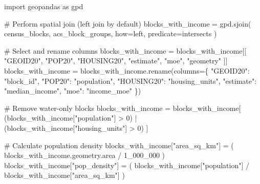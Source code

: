 \documentclass[
  letterpaper,
  DIV=11,
  numbers=noendperiod]{scrartcl}
\newenvironment{Shaded}{\begin{snugshade}}{\end{snugshade}}
\newcommand{\CommentTok}[1]{\textcolor[rgb]{0.37,0.37,0.37}{#1}}
\newcommand{\DecValTok}[1]{\textcolor[rgb]{0.68,0.00,0.00}{#1}}
\newcommand{\ImportTok}[1]{\textcolor[rgb]{0.00,0.46,0.62}{#1}}
\newcommand{\NormalTok}[1]{\textcolor[rgb]{0.00,0.23,0.31}{#1}}
\newcommand{\OperatorTok}[1]{\textcolor[rgb]{0.37,0.37,0.37}{#1}}
\newcommand{\StringTok}[1]{\textcolor[rgb]{0.13,0.47,0.30}{#1}}
\begin{document}
\begin{Shaded}
\begin{Highlighting}[]
\ImportTok{import}\NormalTok{ geopandas }\ImportTok{as}\NormalTok{ gpd}

\CommentTok{\# Perform spatial join (left join by default)}
\NormalTok{blocks\_with\_income }\OperatorTok{=}\NormalTok{ gpd.sjoin(}
\NormalTok{    census\_blocks,}
\NormalTok{    acs\_block\_groups,}
\NormalTok{    how}\OperatorTok{=}\StringTok{\textquotesingle{}left\textquotesingle{}}\NormalTok{,}
\NormalTok{    predicate}\OperatorTok{=}\StringTok{\textquotesingle{}intersects\textquotesingle{}}
\NormalTok{)}

\CommentTok{\# Select and rename columns}
\NormalTok{blocks\_with\_income }\OperatorTok{=}\NormalTok{ blocks\_with\_income[[}
    \StringTok{"GEOID20"}\NormalTok{, }\StringTok{"POP20"}\NormalTok{, }\StringTok{"HOUSING20"}\NormalTok{, }\StringTok{"estimate"}\NormalTok{, }\StringTok{"moe"}\NormalTok{, }\StringTok{"geometry"}
\NormalTok{]]}
\NormalTok{blocks\_with\_income }\OperatorTok{=}\NormalTok{ blocks\_with\_income.rename(columns}\OperatorTok{=}\NormalTok{\{}
    \StringTok{"GEOID20"}\NormalTok{: }\StringTok{"block\_id"}\NormalTok{,}
    \StringTok{"POP20"}\NormalTok{: }\StringTok{"population"}\NormalTok{,}
    \StringTok{"HOUSING20"}\NormalTok{: }\StringTok{"housing\_units"}\NormalTok{,}
    \StringTok{"estimate"}\NormalTok{: }\StringTok{"median\_income"}\NormalTok{,}
    \StringTok{"moe"}\NormalTok{: }\StringTok{"income\_moe"}
\NormalTok{\})}

\CommentTok{\# Remove water{-}only blocks}
\NormalTok{blocks\_with\_income }\OperatorTok{=}\NormalTok{ blocks\_with\_income[}
\NormalTok{    (blocks\_with\_income[}\StringTok{"population"}\NormalTok{] }\OperatorTok{\textgreater{}} \DecValTok{0}\NormalTok{)}
    \OperatorTok{|}\NormalTok{ (blocks\_with\_income[}\StringTok{"housing\_units"}\NormalTok{] }\OperatorTok{\textgreater{}} \DecValTok{0}\NormalTok{)}
\NormalTok{]}

\CommentTok{\# Calculate population density}
\NormalTok{blocks\_with\_income[}\StringTok{"area\_sq\_km"}\NormalTok{] }\OperatorTok{=}\NormalTok{ (}
\NormalTok{    blocks\_with\_income.geometry.area }\OperatorTok{/} \DecValTok{1\_000\_000}
\NormalTok{)}
\NormalTok{blocks\_with\_income[}\StringTok{"pop\_density"}\NormalTok{] }\OperatorTok{=}\NormalTok{ (}
\NormalTok{    blocks\_with\_income[}\StringTok{"population"}\NormalTok{] }\OperatorTok{/}\NormalTok{ blocks\_with\_income[}\StringTok{"area\_sq\_km"}\NormalTok{]}
\NormalTok{)}
\end{Highlighting}
\end{Shaded}
\end{document}
